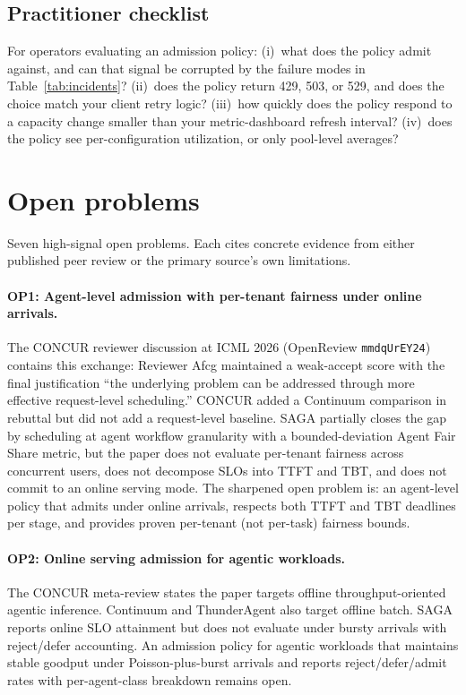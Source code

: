 \documentclass[11pt,letterpaper]{article}
\theoremstyle{definition}
\begin{document}
\subsection{Practitioner checklist}

For operators evaluating an admission policy: (i)~what does the policy
admit against, and can that signal be corrupted by the failure modes
in Table~\ref{tab:incidents}? (ii)~does the policy return 429, 503, or
529, and does the choice match your client retry logic? (iii)~how
quickly does the policy respond to a capacity change smaller than your
metric-dashboard refresh interval? (iv)~does the policy see
per-configuration utilization, or only pool-level averages?

\section{Open problems}
\label{sec:open}

Seven high-signal open problems. Each cites concrete evidence from
either published peer review or the primary source's own limitations.

\paragraph{OP1: Agent-level admission with per-tenant fairness under online arrivals.}
The CONCUR reviewer discussion at ICML 2026 (OpenReview
\texttt{mmdqUrEY24}) contains this exchange: Reviewer Afcg maintained
a weak-accept score with the final justification ``the underlying
problem can be addressed through more effective request-level
scheduling.'' CONCUR added a Continuum comparison in rebuttal but did
not add a request-level baseline. SAGA
\cite{guo2026saga} partially closes the gap by scheduling at agent
workflow granularity with a bounded-deviation Agent Fair Share
metric, but the paper does not evaluate per-tenant fairness across
concurrent users, does not decompose SLOs into TTFT and TBT, and
does not commit to an online serving mode. The sharpened open
problem is: an agent-level policy that admits under online arrivals,
respects both TTFT and TBT deadlines per stage, and provides
proven per-tenant (not per-task) fairness bounds.

\paragraph{OP2: Online serving admission for agentic workloads.}
The CONCUR meta-review states the paper targets offline
throughput-oriented agentic inference. Continuum and ThunderAgent
also target offline batch. SAGA reports online SLO attainment but
does not evaluate under bursty arrivals with reject/defer accounting.
An admission policy for agentic workloads that maintains stable
goodput under Poisson-plus-burst arrivals and reports
reject/defer/admit rates with per-agent-class breakdown remains
open.
\end{document}
